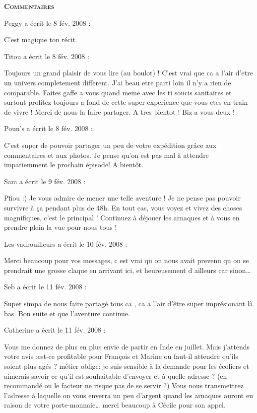 \bigskip
\textbf{\textsc{Commentaires}}

\medskip
Peggy a écrit le 8 fév. 2008 :
\begin{displayquote}
C'est magique ton récit.
\end{displayquote}

\medskip
Titou a écrit le 8 fév. 2008 :
\begin{displayquote}
Toujours un grand plaisir de vous lire (au boulot) ! C'est vrai que ca a l'air d'etre un univers completement different. J'ai beau etre parti loin il n'y a rien de comparable. Faites gaffe a vous quand meme avec les ti soucis sanitaires et surtout profitez toujours a fond de cette super experience que vous etes en train de vivre ! Merci de nous la faire partager. A tres bientot ! Biz a vous deux !
\end{displayquote}

\medskip
Poun's a écrit le 8 fév. 2008 :
\begin{displayquote}
C'est super de pouvoir partager un peu de votre expédition grâce aux commentaires et aux photos. Je pense qu'on est pas mal à attendre impatiemment le prochain épisode!
A bientôt.
\end{displayquote}

\medskip
Sam a écrit le 9 fév. 2008 :
\begin{displayquote}
Pfiou :) Je vous admire de mener une telle aventure ! Je ne pense pas pouvoir survivre à ça pendant plus de 48h.
En tout cas, vous voyez et vivez des choses magnifiques, c'est le principal ! Continuez à déjouer les arnaques et à vous en prendre plein la vue pour nous tous !
\end{displayquote}

\medskip
Les vadrouilleurs a écrit le 10 fév. 2008 :
\begin{displayquote}
Merci beaucoup pour vos messages, c est vrai qu on nous avait prevenu qu on se prendrait une grosse claque en arrivant ici, et heureusement d ailleurs car sinon\dots
\end{displayquote}

\medskip
Seb a écrit le 11 fév. 2008 :
\begin{displayquote}
Super simpa de nous faire partagé tous ca , ca a l'air d'être super imprésionant là bas.
Bon suite et que l'aventure continue.
\end{displayquote}

\medskip
Catherine a écrit le 11 fév. 2008 :
\begin{displayquote}
Vous me donnez de plus en plus envie de partir en Inde en juillet. Mais j'attends votre avis :est-ce profitable pour François et Marine ou faut-il attendre qu'ils soient plus agés ?
        métier oblige: je suis sensible à la demande pour les écoliers et aimerais savoir ce qu'il est souhaitable d'envoyer et à quelle adresse ? (en recommandé ou le facteur ne risque pas de se servir ?)
        Vous nous transmettrez l'adresse à laquelle on vous enverra un peu d'argent quand les arnaques auront eu raison de votre porte-monnaie\dots
                merci beaucoup à Cécile pour son appel.
\end{displayquote}

